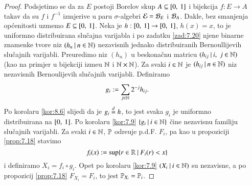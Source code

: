 \begin{proof}
    Podsjetimo se da za $E$ postoji Borelov skup $A \subseteq [{0}, \:{1}]$ i bijekcija $f : E \to A$ takav da su $f$ i $f^{-1}$ izmjerive u paru $\sigma$-algebri $\mathcal{E} =  \mathcal{B}_{E}$ i $\mathcal{B}_{A}$.
    Dakle, bez smanjenja op\' cenitosti uzmemo $E \subseteq [{0}, \:{1}]$. Neka je $h: [{0}, \:{1}] \to [{0}, \:{1}]$, $h(x) = x$, to je uniformno distribuirana slu\v cajna varijabla i po zadatku \ref{zad:7.20} njene binarne znamenke tvore niz $({h_n} \: | \: {n \in \mathbb{N}})$ nezavisnih jednako distribuiranih Bernoullijevih slu\v cajnih varijabli.
    Preuredimo niz $(h_n)$ u beskona\v cnu matricu $({h_{ij}} \: | \: {i, \; j \in \mathbb{N}})$ (kao na primjer u bijekciji izme\dj u $\mathbb{N}$ i $\mathbb{N} \times \mathbb{N}$).
    Za svaki $i \in \mathbb{N}$ je $({h_{ij}} \: | \: {n \in \mathbb{N}})$ niz nezavisnih Bernoulijevih slu\v cajnih varijabli.
    Definiramo
    \begin{equation*}
        g_i := \sum\limits_{j \in \mathbb{N}}^{} 2^{-j} h_{ij}.
    \end{equation*}
    Po korolaru \ref{kor:8.6} slijedi da je $g_i \overset{d}{=} h$, to jest svaka $g_i$ je uniformno distribuirana na $[{0}, \:{1}]$.
    Po korolaru \ref{kor:7.9} $\{{g_i} \: | \: {i \in \mathbb{N}}\}$ \v cine nezavisnu familiju slu\v cajnih varijabli.
    Za svaki $i \in \mathbb{N}$, $\mathbb{P}$ odre\dj uje p.d.F. $F_i$, pa kao u propoziciji \ref{prop:7.18} stavimo
    \begin{equation*}
        f_i (x) := \sup \{{r \in \mathbb{R}} \: | \: {F_i (r) < x}\}
    \end{equation*}
    i definiramo $X_i = f_i \circ g_i$.
    Opet po korolaru \ref{kor:7.9} $({X_i} \: | \: {i \in \mathbb{N}})$ su nezavisne, a po propozicij \ref{prop:7.18} $F_{X_i} = F_i$, to jest $\mathbb{P}_{X_i} = \mathbb{P}_i$.
\end{proof}